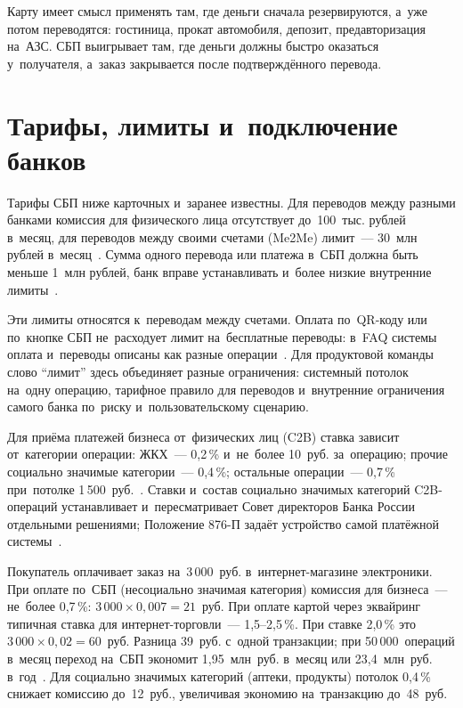 Карту имеет смысл применять там, где деньги сначала резервируются, а~уже потом
переводятся: гостиница, прокат автомобиля, депозит, предавторизация на~АЗС. СБП
выигрывает там, где деньги должны быстро оказаться у~получателя, а~заказ
закрывается после подтверждённого перевода.

\section{Тарифы, лимиты и~подключение банков}\label{sec:sbp-tariffs}

Тарифы СБП ниже карточных и~заранее известны. Для переводов между разными
банками комиссия для физического лица отсутствует до~100~тыс. рублей в~месяц,
для переводов между своими счетами (Me2Me)
лимит~--- 30~млн рублей
в~месяц~\cite{sbp-faq-transfers}. Сумма одного перевода или платежа в~СБП должна
быть меньше 1~млн рублей, банк вправе устанавливать и~более низкие внутренние
лимиты~\cite{sbp-faq-transfers}.

Эти лимиты относятся к~переводам между счетами. Оплата по~QR-коду или по~кнопке
СБП не~расходует лимит на~бесплатные переводы: в~FAQ системы оплата и~переводы
описаны как разные операции~\cite{sbp-faq-transfers}. Для продуктовой команды
слово \enquote{лимит} здесь объединяет разные ограничения: системный потолок
на~одну операцию, тарифное правило для переводов и~внутренние ограничения самого
банка по~риску и~пользовательскому сценарию.

Для приёма платежей бизнеса от~физических лиц (C2B) ставка зависит от~категории
операции: ЖКХ~--- 0,2\,\% и~не~более 10~руб. за~операцию; прочие социально
значимые категории~--- 0,4\,\%; остальные операции~--- 0,7\,\% при~потолке
1\,500~руб.~\cite{cbr-sbp-c2b-tariffs}. Ставки и~состав социально значимых
категорий C2B-операций устанавливает и~пересматривает Совет директоров Банка
России отдельными решениями; Положение 876-П задаёт устройство самой платёжной
системы~\cite{cbr-876p,cbr-sbp-rules}.

Покупатель оплачивает заказ на~3\,000~руб. в~интернет-магазине электроники. При
оплате по~СБП (несоциально значимая категория) комиссия для бизнеса~--- не~более
0,7\,\%: $3\,000 \times 0{,}007 = 21$~руб. При оплате картой через эквайринг
типичная ставка для интернет-торговли~--- \mbox{1,5--2,5\,\%}. При ставке 2,0\,\% это
$3\,000 \times 0{,}02 = 60$~руб. Разница 39~руб. с~одной транзакции; при
50\,000~операций в~месяц переход на~СБП экономит 1,95~млн~руб. в~месяц или
23,4~млн~руб. в~год~\cite{cbr-sbp-c2b-tariffs}. Для социально значимых категорий
(аптеки, продукты) потолок 0,4\,\% снижает комиссию до~12~руб.,
увеличивая экономию на~транзакцию до~48~руб.

